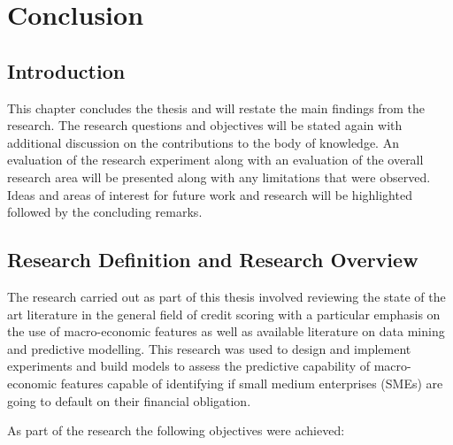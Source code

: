 \chapter{Conclusion} %

\label{Chapter6} %



\section{Introduction}
This chapter concludes the thesis and will restate the main findings from the research. The research questions and objectives will be stated again with additional discussion on the contributions to the body of knowledge. An evaluation of the research experiment along with an evaluation of the overall research area will be presented along with any limitations that were observed. Ideas and areas of interest for future work and research will be highlighted followed by the concluding remarks.

\section{Research Definition and Research Overview}
The research carried out as part of this thesis involved reviewing the state of the art literature in the general field of credit scoring with a particular emphasis on the use of macro-economic features as well as available literature on data mining and predictive modelling. This research was used to design and implement experiments and build models to assess the predictive capability of macro-economic features capable of identifying if small medium enterprises (SMEs) are going to default on their financial obligation. 

As part of the research the following objectives were achieved:

